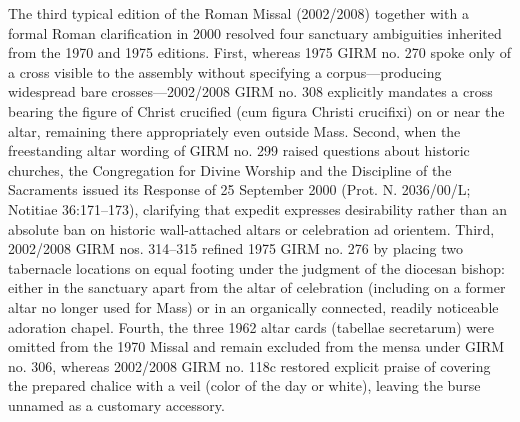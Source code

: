 \PCDEntryRule

\label{pc-obj-hist-1970-sanctuary-clarifications}
The third typical edition of the Roman Missal (2002/2008) together with a formal Roman clarification in 2000 resolved four sanctuary ambiguities inherited from the 1970 and 1975 editions. First, whereas 1975 GIRM no. 270 spoke only of a cross visible to the assembly without specifying a corpus---producing widespread bare crosses---2002/2008 GIRM no. 308 explicitly mandates a cross bearing the figure of Christ crucified (cum figura Christi crucifixi) on or near the altar, remaining there appropriately even outside Mass. Second, when the freestanding altar wording of GIRM no. 299 raised questions about historic churches, the Congregation for Divine Worship and the Discipline of the Sacraments issued its Response of 25 September 2000 (Prot. N. 2036/00/L; Notitiae 36:171--173), clarifying that expedit expresses desirability rather than an absolute ban on historic wall-attached altars or celebration ad orientem. Third, 2002/2008 GIRM nos. 314--315 refined 1975 GIRM no. 276 by placing two tabernacle locations on equal footing under the judgment of the diocesan bishop: either in the sanctuary apart from the altar of celebration (including on a former altar no longer used for Mass) or in an organically connected, readily noticeable adoration chapel. Fourth, the three 1962 altar cards (tabellae secretarum) were omitted from the 1970 Missal and remain excluded from the mensa under GIRM no. 306, whereas 2002/2008 GIRM no. 118c restored explicit praise of covering the prepared chalice with a veil (color of the day or white), leaving the burse unnamed as a customary accessory.

